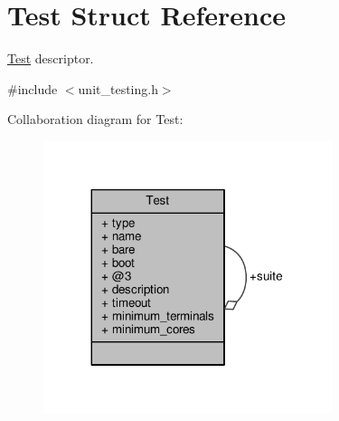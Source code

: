 \hypertarget{structTest}{\section{Test Struct Reference}
\label{structTest}
}


\hyperlink{structTest}{Test} descriptor.  




{\ttfamily \#include $<$unit\-\_\-testing.\-h$>$}



Collaboration diagram for Test\-:
\nopagebreak
\begin{figure}[H]
\begin{center}
\leavevmode
\includegraphics[width=239pt]{structTest__coll__graph}
\end{center}
\end{figure}

